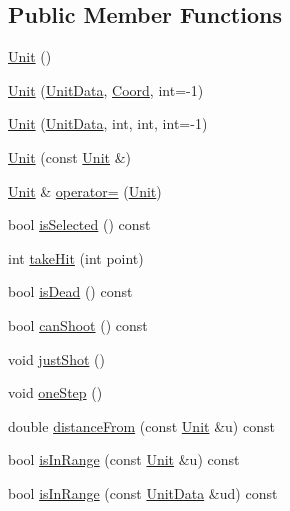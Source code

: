 \subsection*{Public Member Functions}
\begin{DoxyCompactItemize}
\item 
\hyperlink{classghost_1_1Unit_abeb9f38ac59d79647e2ca99a1ceacd99}{Unit} ()
\item 
\hyperlink{classghost_1_1Unit_a7f0a37abfc313f96251e9f6999e243b9}{Unit} (\hyperlink{structghost_1_1UnitData}{Unit\-Data}, \hyperlink{structghost_1_1Coord}{Coord}, int=-\/1)
\item 
\hyperlink{classghost_1_1Unit_aea6197d87e619b053e6e9fcacf03a3ce}{Unit} (\hyperlink{structghost_1_1UnitData}{Unit\-Data}, int, int, int=-\/1)
\item 
\hyperlink{classghost_1_1Unit_a0a1ad686d4679dfca5d1044ded41a87a}{Unit} (const \hyperlink{classghost_1_1Unit}{Unit} \&)
\item 
\hyperlink{classghost_1_1Unit}{Unit} \& \hyperlink{classghost_1_1Unit_ac4fc9086478925b2f2320d4228807320}{operator=} (\hyperlink{classghost_1_1Unit}{Unit})
\item 
bool \hyperlink{classghost_1_1Unit_ab70ad4d9a69f8d23d6002b187e096cff}{is\-Selected} () const 
\item 
int \hyperlink{classghost_1_1Unit_a26694b0032e8fd394841c99d92d27604}{take\-Hit} (int point)
\item 
bool \hyperlink{classghost_1_1Unit_aba5b4df1bb091711fc6a13ed08223231}{is\-Dead} () const 
\item 
bool \hyperlink{classghost_1_1Unit_ad78528a5b7ec9682646bfbbeccb46473}{can\-Shoot} () const 
\item 
void \hyperlink{classghost_1_1Unit_ab7fd1da43562cf36a254953cff45ee24}{just\-Shot} ()
\item 
void \hyperlink{classghost_1_1Unit_a854f0bca7fca429ef33e4af97d5f647d}{one\-Step} ()
\item 
double \hyperlink{classghost_1_1Unit_ad1284798367694b78f9b1fdc68d79daf}{distance\-From} (const \hyperlink{classghost_1_1Unit}{Unit} \&u) const 
\item 
bool \hyperlink{classghost_1_1Unit_a75692cefef39aa5d3f65308426849787}{is\-In\-Range} (const \hyperlink{classghost_1_1Unit}{Unit} \&u) const 
\item 
bool \hyperlink{classghost_1_1Unit_a8aa83316a45d49fbaebce203756033a0}{is\-In\-Range} (const \hyperlink{structghost_1_1UnitData}{Unit\-Data} \&ud) const 
\item 

\end{DoxyCompactItemize}
